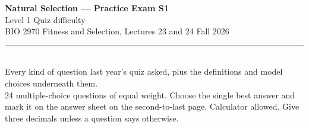 \documentclass[11pt]{article}
\begin{document}
\begin{center}
  {\LARGE\bfseries Natural Selection --- Practice Exam S1}\\[5pt]
  {\large Level 1 \quad\textbullet\quad Quiz difficulty}\\[6pt]
  BIO 2970 \quad\textbullet\quad Fitness and Selection, Lectures 23 and 24 \quad\textbullet\quad Fall 2026\\[3pt]
  \rule{\textwidth}{0.8pt}\\[3pt]
  {\small Every kind of question last year's quiz asked, plus the definitions and model choices underneath them.\\[2pt] 24 multiple-choice questions of equal weight. Choose the single best answer and mark it on the answer sheet on the second-to-last page. Calculator allowed. Give three decimals unless a question says otherwise.}
\end{center}
\vspace{0.4em}
\end{document}
